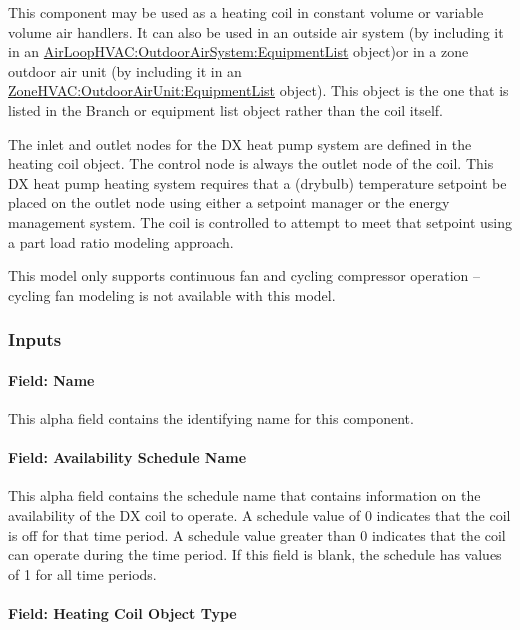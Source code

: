 This component may be used as a heating coil in constant volume or variable volume air handlers. It can also be used in an outside air system (by including it in an \hyperref[airloophvacoutdoorairsystemequipmentlist]{AirLoopHVAC:OutdoorAirSystem:EquipmentList} object)or in a zone outdoor air unit (by including it in an \hyperref[zonehvacoutdoorairunitequipmentlist]{ZoneHVAC:OutdoorAirUnit:EquipmentList} object). This object is the one that is listed in the Branch or equipment list object rather than the coil itself.

The inlet and outlet nodes for the DX heat pump system are defined in the heating coil object. The control node is always the outlet node of the coil. This DX heat pump heating system requires that a (drybulb) temperature setpoint be placed on the outlet node using either a setpoint manager or the energy management system. The coil is controlled to attempt to meet that setpoint using a part load ratio modeling approach.

This model only supports continuous fan and cycling compressor operation -- cycling fan modeling is not available with this model.

\subsubsection{Inputs}\label{inputs-24}

\paragraph{Field: Name}\label{field-name-23-000}

This alpha field contains the identifying name for this component.

\paragraph{Field: Availability Schedule Name}\label{field-availability-schedule-name-14}

This alpha field contains the schedule name that contains information on the availability of the DX coil to operate. A schedule value of 0 indicates that the coil is off for that time period. A schedule value greater than 0 indicates that the coil can operate during the time period. If this field is blank, the schedule has values of 1 for all time periods.

\paragraph{Field: Heating Coil Object Type}\label{field-heating-coil-object-type-000}

